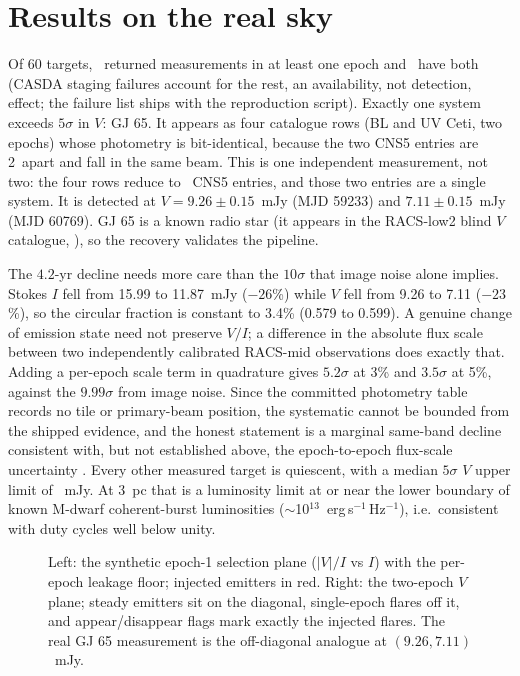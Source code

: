 \documentclass[twocolumn]{aastex631}
\begin{document}
\section{Results on the real sky}
Of 60 targets, \svdRealN\ returned measurements in at least one epoch and \svdRealPairs\ have
both (CASDA staging failures account for the rest, an availability, not detection, effect;
the failure list ships with the reproduction script). Exactly one system exceeds $5\sigma$ in $V$: GJ 65.
It appears as four catalogue rows (BL and UV Ceti, two epochs) whose photometry is
bit-identical, because the two CNS5 entries are 2\arcsec\ apart and fall in the same beam.
This is one independent measurement, not two: the four rows reduce to \svdRealDet\ CNS5
entries, and those two entries are a single system. It is
detected at $V=9.26\pm0.15$~mJy (MJD 59233) and $7.11\pm0.15$~mJy (MJD 60769). GJ 65 is a known
radio star (it appears in the RACS-low2 blind $V$ catalogue, \citealt{racs8_2026}), so the
recovery validates the pipeline.

The $4.2$-yr decline needs more care than the $10\sigma$ that image noise alone implies.
Stokes $I$ fell from 15.99 to 11.87~mJy ($-26$\%) while $V$ fell from 9.26 to 7.11 ($-23$\%),
so the circular fraction is constant to 3.4\% (0.579 to 0.599). A genuine change of emission
state need not preserve $V/I$; a difference in the absolute flux scale between two
independently calibrated RACS-mid observations does exactly that. Adding a per-epoch scale
term in quadrature gives $5.2\sigma$ at 3\% and $3.5\sigma$ at 5\%, against the $9.99\sigma$
from image noise. Since the committed photometry table records no tile or primary-beam
position, the systematic cannot be bounded from the shipped evidence, and the honest statement
is a marginal same-band decline consistent with, but not established above, the
epoch-to-epoch flux-scale uncertainty \citep{duchesne2023}. Every other measured target is quiescent, with a median $5\sigma$ $V$ upper limit of
\svdRealVlim~mJy. At 3~pc that is a luminosity limit at or near the lower boundary of known M-dwarf coherent-burst
luminosities ($\sim$10$^{13}$~erg\,s$^{-1}$\,Hz$^{-1}$), i.e.\ consistent with duty cycles well
below unity.

\begin{figure}
\caption{Left: the synthetic epoch-1 selection plane ($|V|/I$ vs $I$) with the per-epoch
leakage floor; injected emitters in red. Right: the two-epoch $V$ plane; steady emitters
sit on the diagonal, single-epoch flares off it, and appear/disappear flags mark exactly the
injected flares. The real GJ 65 measurement is the off-diagonal analogue at
$(9.26, 7.11)$~mJy.}
\label{fig:svd}
\end{figure}
\end{document}
